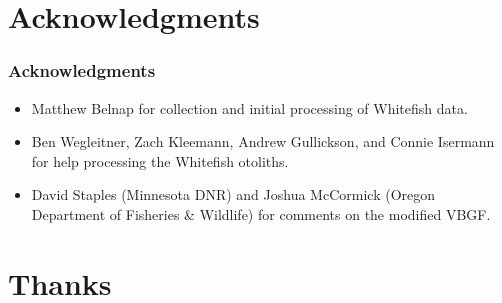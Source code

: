 \documentclass[xcolor=dvipsnames,t]{beamer}\usepackage[]{graphicx}\usepackage[]{color}
\begin{document}
\section*{Acknowledgments}
\begin{frame}[fragile]
\frametitle{Acknowledgments}
\begin{itemize}
  \item Matthew Belnap for collection and initial processing of Whitefish data.
  \bigskip
  \item Ben Wegleitner, Zach Kleemann, Andrew Gullickson, and Connie Isermann for help processing the Whitefish otoliths.
  \bigskip
  \item David Staples (Minnesota DNR) and Joshua McCormick (Oregon Department of Fisheries \& Wildlife) for comments on the modified VBGF.
\end{itemize}
\end{frame}


\section*{Thanks}
\begin{frame}[plain]
\end{frame}
\end{document}
